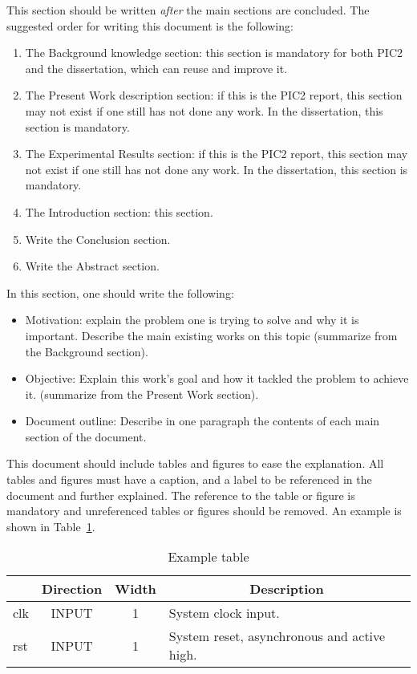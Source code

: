 This section should be written {\em after} the main sections are concluded. The suggested order for writing this document is the following:

\begin{enumerate}
\item The Background knowledge section: this section is mandatory for both PIC2 and the dissertation, which can reuse and improve it.
\item The Present Work description section: if this is the PIC2 report, this section may not exist if one still has not done any work. In the dissertation, this section is mandatory.
\item The Experimental Results section: if this is the PIC2 report, this section may not exist if one still has not done any work. In the dissertation, this section is mandatory.
\item The Introduction section: this section.
\item Write the Conclusion section.
\item Write the Abstract section.
\end{enumerate}

In this section, one should write the following:
\begin{itemize}
\item Motivation: explain the problem one is trying to solve and why it is
important. Describe the main existing works on this topic (summarize from the
Background section).
\item Objective: Explain this work's goal and how it tackled the problem to
achieve it. (summarize from the Present Work section).
\item Document outline: Describe in one paragraph the contents of each main section of
the document.
\end{itemize}

This document should include tables and figures to ease the explanation. All
tables and figures must have a caption, and a label to be referenced in the
document and further explained. The reference to the table or figure is
mandatory and unreferenced tables or figures should be removed. An example is
shown in Table~\ref{tab:ex}.

\begin{longtable}{|l|c|c|p{6.4cm}|}
    \caption{Example table}\label{tab:ex}\\ \hline
    \rowcolor{iob-green}
    \multicolumn{1}{|c|}{\bf Name} & \multicolumn{1}{c|}{\bf Direction} & \multicolumn{1}{c|}{\bf Width} & \multicolumn{1}{c|}{\bf Description}  \\ \hline \hline
    clk & INPUT & 1 & System clock input.
 \\ \hline
\rowcolor{iob-blue}
rst & INPUT & 1 & System reset, asynchronous and active high.
 \\ \hline
\end{longtable}
